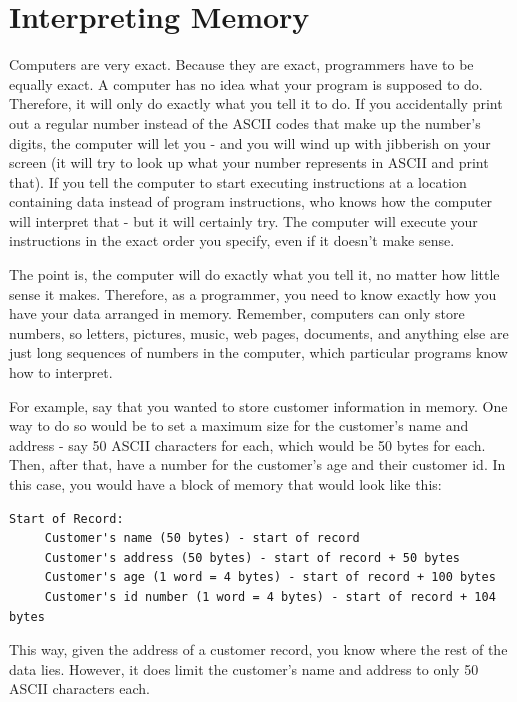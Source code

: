 \section{Interpreting Memory}
\label{interpretingmemory}

Computers are very exact.  Because they are exact, programmers have to be
equally exact.  A computer has no idea what your program is supposed to
do.  Therefore, it will only do exactly what you tell it to do.  If you
accidentally print out a regular number instead of the ASCII codes that make up the number's digits, the
computer will let you - and you will wind up with jibberish on your screen (it will try to look up what your number represents in ASCII and print that).
If you tell the computer to start executing instructions at a location
containing data instead of program instructions, who knows how the computer will interpret that - 
but it will certainly try.  The computer will execute your instructions in
the exact order you specify, even if it doesn't make sense.

The point is, the computer will do exactly
what you tell it, no matter how little sense it makes.  Therefore, as
a programmer, you need to know exactly how you have your data arranged
in memory.  Remember, computers can only store numbers, so letters, pictures,
music, web pages, documents, and anything else are just long sequences
of numbers in the computer, which particular programs know how to interpret.

For example, say that you wanted to store customer information in memory.
One way to do so would be to set a maximum size for the customer's name 
and address - say 50 ASCII characters for each, which would be 50 bytes for each.
Then, after that, have a number for the customer's age and their customer
id.  In this case, you would have a block of memory that would look like
this:

\begin{simpletyping}
\begin{lstlisting}
Start of Record:
     Customer's name (50 bytes) - start of record
     Customer's address (50 bytes) - start of record + 50 bytes
     Customer's age (1 word = 4 bytes) - start of record + 100 bytes
     Customer's id number (1 word = 4 bytes) - start of record + 104 bytes
\end{lstlisting}
\end{simpletyping}

This way, given the address of a customer record, you know where the rest
of the data lies.  However, it does limit the customer's name and address
to only 50 ASCII characters each.

